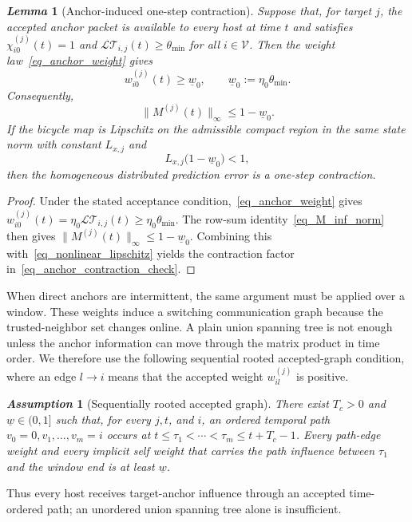 \documentclass[letterpaper,journal]{IEEEtran}
\def\V{\mathcal{V}} %
\def\LT{\mathcal{LT}} %
\newtheorem{lemma}{\it Lemma}%
\newtheorem{assumption}{\it Assumption}%
\begin{document}
\begin{lemma}[Anchor-induced one-step contraction]\label{lem_anchor_contraction}
Suppose that, for target $j$, the accepted anchor packet is available to every host at time $t$ and satisfies $\chi_{i0}^{(j)}(t)=1$ and $\LT_{i,j}(t)\ge\theta_{\min}$ for all $i\in\V$. Then the weight law~\eqref{eq_anchor_weight} gives
\begin{equation}
    w_{i0}^{(j)}(t)\ge \underline w_0,
    \qquad
    \underline w_0:=\eta_0\theta_{\min} .
\end{equation}
Consequently,
\begin{equation}
    \|M^{(j)}(t)\|_{\infty}\le 1-\underline w_0.
\end{equation}
If the bicycle map is Lipschitz on the admissible compact region in the same state norm with constant $L_{x,j}$ and
\begin{equation}
    L_{x,j}\big(1-\underline w_0\big)<1,
    \label{eq_anchor_contraction_check}
\end{equation}
then the homogeneous distributed prediction error is a one-step contraction.
\end{lemma}
\begin{proof}
Under the stated acceptance condition,~\eqref{eq_anchor_weight} gives $w_{i0}^{(j)}(t)=\eta_0\LT_{i,j}(t)\ge\eta_0\theta_{\min}$. The row-sum identity~\eqref{eq_M_inf_norm} then gives $\|M^{(j)}(t)\|_{\infty}\le1-\underline w_0$. Combining this with~\eqref{eq_nonlinear_lipschitz} yields the contraction factor in~\eqref{eq_anchor_contraction_check}.
\end{proof}

When direct anchors are intermittent, the same argument must be applied over a window. These weights induce a switching communication graph because the trusted-neighbor set changes online. A plain union spanning tree is not enough unless the anchor information can move through the matrix product in time order. We therefore use the following sequential rooted accepted-graph condition, where an edge $l\to i$ means that the accepted weight $w_{il}^{(j)}$ is positive.
\begin{assumption}[Sequentially rooted accepted graph]\label{ass_graph}
There exist $T_c>0$ and $\underline w\in(0,1]$ such that, for every $j,t$, and $i$, an ordered temporal path $v_0=0,v_1,\ldots,v_m=i$ occurs at $t\le\tau_1<\cdots<\tau_m\le t+T_c-1$. Every path-edge weight and every implicit self weight that carries the path influence between $\tau_1$ and the window end is at least $\underline w$.
\end{assumption}
Thus every host receives target-anchor influence through an accepted time-ordered path; an unordered union spanning tree alone is insufficient.
\end{document}
